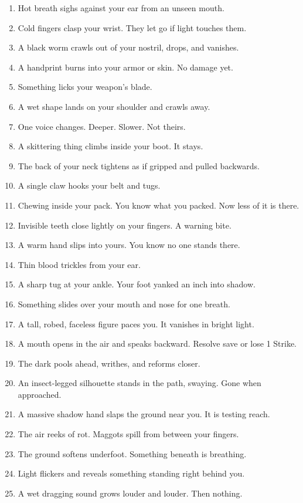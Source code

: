 \documentclass[10pt,twoside]{article}
\begin{document}
\begin{multicols}{2}
{\begin{enumerate}
\item Hot breath sighs against your ear from an unseen mouth.
\item Cold fingers clasp your wrist. They let go if light touches them.
\item A black worm crawls out of your nostril, drops, and vanishes.
\item A handprint burns into your armor or skin. No damage yet.
\item Something licks your weapon's blade.
\item A wet shape lands on your shoulder and crawls away.
\item One voice changes. Deeper. Slower. Not theirs.
\item A skittering thing climbs inside your boot. It stays.
\item The back of your neck tightens as if gripped and pulled backwards.
\item A single claw hooks your belt and tugs.
\item Chewing inside your pack. You know what you packed. Now less of it is there.
\item Invisible teeth close lightly on your fingers. A warning bite.
\item A warm hand slips into yours. You know no one stands there.
\item Thin blood trickles from your ear.
\item A sharp tug at your ankle. Your foot yanked an inch into shadow.
\item Something slides over your mouth and nose for one breath.
\item A tall, robed, faceless figure paces you. It vanishes in bright light.
\item A mouth opens in the air and speaks backward. Resolve save or lose 1 Strike.
\item The dark pools ahead, writhes, and reforms closer.
\item An insect-legged silhouette stands in the path, swaying. Gone when approached.
\item A massive shadow hand slaps the ground near you. It is testing reach.
\item The air reeks of rot. Maggots spill from between your fingers.
\item The ground softens underfoot. Something beneath is breathing.
\item Light flickers and reveals something standing right behind you.
\item A wet dragging sound grows louder and louder. Then nothing.

\end{enumerate}}
\end{multicols}
\end{document}
